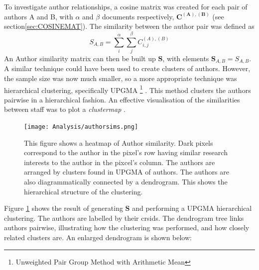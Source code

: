 To investigate author relationships, a cosine matrix was created for each pair of authors A and B, with $\alpha$ and $\beta$ documents respectively, $\mathbf{C^{\left( A \right ) , \left( B \right)}}$ (see section\ref{sec:COSINEMAT}). The similarity between the author pair was defined as 
$$S_{A , B} = \sum_{i}^{\alpha} \sum_{j}^{\beta} C^{\left( A \right) , \left( B \right) }_{ i , j }$$
An Author similarity matrix can then be built up $\mathbf{S}$, with elements $\mathbf{S}_{ A , B }=S_{ A , B }$.
A similar technique could have been used to create clusters of authors. However, the sample size was now much smaller, so a more appropriate technique was hierarchical clustering, specifically UPGMA \footnote{Unweighted Pair Group Method with Arithmetic Mean} \cite{heatmapcluster}. This method clusters the authors pairwise in a hierarchical fashion.  An effective visualisation of the similarities between staff was to plot a \emph{clustermap} \cite{seaborn} \cite{scipy}.
\begin{center}
\begin{figure}[H]
\label{fig:AUTHORSIMS}
  \centering
    \texttt{[image: Analysis/authorsims.png]}
    \caption{This figure shows a heatmap of Author similarity. Dark pixels correspond to the author in the pixel's row having similar research interests to the author in the pixcel's column. The authors are arranged by clusters found in UPGMA of authors. The authors are also diagrammatically connected by a dendrogram. This shows the hierarchical structure of the clustering.}
\end{figure} 
\end{center}
Figure \ref{fig:AUTHORSIMS} shows the result of generating $\textbf{S}$ and performing a UPGMA hierarchical clustering. The authors are labelled by their crsids. The dendrogram tree links authors pairwise, illustrating how the clustering was performed, and how closely related clusters are. An enlarged dendrogram is shown below:
